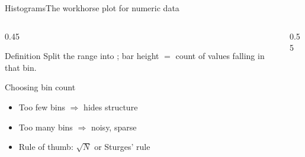 \documentclass[aspectratio=169,11pt]{beamer}
\begin{document}
\begin{frame}{Histograms}{The workhorse plot for numeric data}
  \begin{columns}[T]
    \begin{column}{0.45\textwidth}
      \begin{block}{Definition}
        \small Split the range into ; bar height $=$ count of
        values falling in that bin.
      \end{block}
      \begin{alertblock}{Choosing bin count}
        \small
        \begin{itemize}
          \item Too few bins $\Rightarrow$ hides structure
          \item Too many bins $\Rightarrow$ noisy, sparse
          \item Rule of thumb: $\sqrt{N}$ or Sturges' rule
        \end{itemize}
      \end{alertblock}
    \end{column}
    \begin{column}{0.55\textwidth}
      \begin{center}
      \end{center}
    \end{column}
  \end{columns}
\end{frame}
\end{document}
